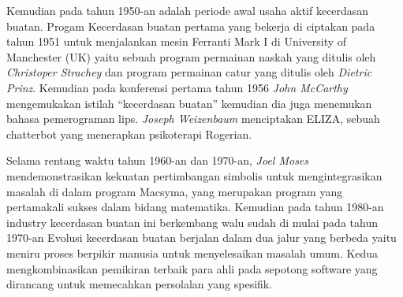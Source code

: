\begin{enumerate}
Kemudian pada tahun 1950-an adalah periode awal usaha aktif kecerdasan buatan. Progam Kecerdasan buatan pertama yang bekerja di ciptakan pada tahun 1951 untuk menjalankan mesin Ferranti Mark I di University of Manchester (UK) yaitu sebuah program permainan naskah yang ditulis oleh \textit{Christoper Strachey} dan program permainan catur yang ditulis oleh \textit{Dietric Prinz}. Kemudian pada konferensi pertama tahun 1956  \textit{John McCarthy} mengemukakan istilah “kecerdasan buatan” kemudian dia juga menemukan bahasa pemerograman lips. \textit{Joseph Weizenbaum}  menciptakan ELIZA, sebuah chatterbot yang menerapkan psikoterapi Rogerian.\par
Selama rentang waktu tahun 1960-an dan 1970-an, \textit{Joel Moses}  mendemonstrasikan kekuatan pertimbangan simbolis untuk mengintegrasikan masalah di dalam program Macsyma, yang merupakan program yang pertamakali sukses dalam bidang matematika. Kemudian pada tahun 1980-an industry kecerdasan buatan ini berkembang walu sudah di mulai pada tahun 1970-an Evolusi kecerdasan buatan berjalan dalam dua jalur yang berbeda yaitu meniru proses berpikir manusia untuk menyelesaikan masalah umum. Kedua mengkombinasikan pemikiran terbaik para ahli pada sepotong software yang dirancang untuk memecahkan persolalan yang spesifik. 


\end{enumerate}
